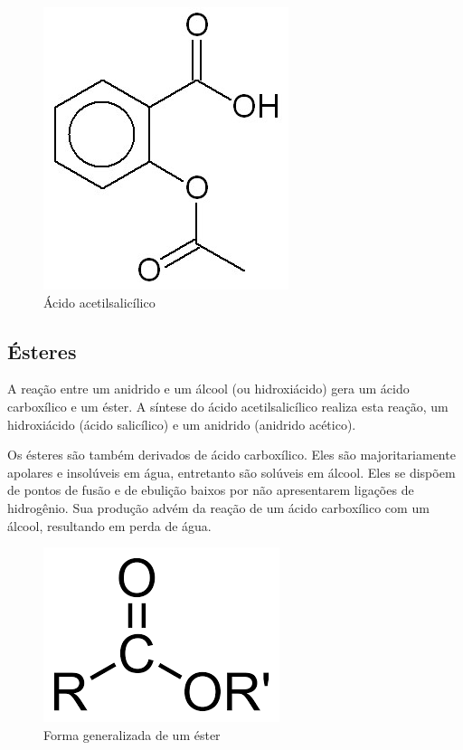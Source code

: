\begin{figure}[H]
\begin{center}
    \includegraphics[scale=0.5]{figuras/acido_acetilsalicilico.jpg}
\end{center}
\caption{Ácido acetilsalicílico}
\label{fig:acido_AAS}
\end{figure}

\subsection{Ésteres}

A reação entre um anidrido e um álcool (ou hidroxiácido) gera um ácido carboxílico e um éster. A
síntese do ácido acetilsalicílico realiza esta reação, um hidroxiácido (ácido salicílico) e um
anidrido (anidrido acético).

Os ésteres são também derivados de ácido carboxílico. Eles são majoritariamente apolares e
insolúveis em água, entretanto são solúveis em álcool. Eles se dispõem de pontos de fusão e de
ebulição baixos por não apresentarem ligações de hidrogênio. Sua produção advém da reação de um
ácido carboxílico com um álcool, resultando em perda de água. \cite{SantosES}

\begin{figure}[H]
\begin{center}
    \includegraphics[scale=.5]{figuras/ester.png}
\end{center}
\caption{Forma generalizada de um éster}
\label{fig:ester}
\end{figure}

